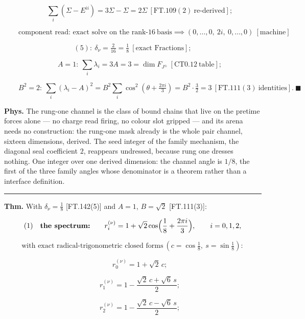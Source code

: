 \begin{theorem}[{\texorpdfstring{FT.142 — The rung-one arena and the channel angle $\delta_\nu=\tfrac18$}{FT.142 - The rung-one arena and the channel angle}}]
\[
\qquad \textstyle\sum_i(\Sigma-E^{ii})=3\Sigma-\Sigma=2\Sigma\ [\mathrm{FT.109}(2)\ \text{re-derived}];
\]

\[
\qquad \text{component read: exact solve on the rank-}16\ \text{basis}\implies(0,\dots,0,\ 2i,\ 0,\dots,0)\ [\text{machine}]
\]

\[
(5):\ \delta_\nu=\tfrac{2}{16}=\tfrac18\ [\text{exact Fractions}];
\]

\[
\qquad A=1:\ \textstyle\sum_i\lambda_i=3A=3=\dim F_{J^\pm}\ [\mathrm{CT0.12}\ \text{table}];
\]

\[
\qquad B^2=2:\ \textstyle\sum_i(\lambda_i-A)^2=B^2\textstyle\sum_i\cos^2(\theta+\tfrac{2\pi i}3)=B^2\cdot\tfrac32=3\ [\mathrm{FT.111}(3)\ \text{identities}].\ \blacksquare
\]

\textbf{Phys.} The rung-one channel is the class of bound chains that live on the pretime forces alone — no charge read firing, no colour slot gripped — and its arena needs no construction: the rung-one mask already is the whole pair channel, sixteen dimensions, derived. The seed integer of the family mechanism, the diagonal seal coefficient $2$, reappears undressed, because rung one dresses nothing. One integer over one derived dimension: the channel angle is $1/8$, the first of the three family angles whose denominator is a theorem rather than a interface definition.

\vspace{2pt}\noindent\rule{\textwidth}{0.4pt}\vspace{2pt}

\end{theorem}

\label{tag:FT-143}
\textbf{Thm.} With $\delta_\nu=\tfrac18$ [FT.142(5)] and $A=1$, $B=\sqrt2$ [FT.111(3)]:

\[
(1)\quad\textbf{the spectrum:}\qquad r_i^{(\nu)}=1+\sqrt2\cos\Bigl(\frac18+\frac{2\pi i}{3}\Bigr),\qquad i=0,1,2,
\]

\[
\text{with exact radical-trigonometric closed forms}\ (c=\cos\tfrac18,\ s=\sin\tfrac18):
\]

\[
\qquad r_0^{(\nu)}=1+\sqrt2\,c;
\]

\[
\qquad r_1^{(\nu)}=1-\frac{\sqrt2\,c+\sqrt6\,s}{2};
\]

\[
\qquad r_2^{(\nu)}=1-\frac{\sqrt2\,c-\sqrt6\,s}{2};
\]

